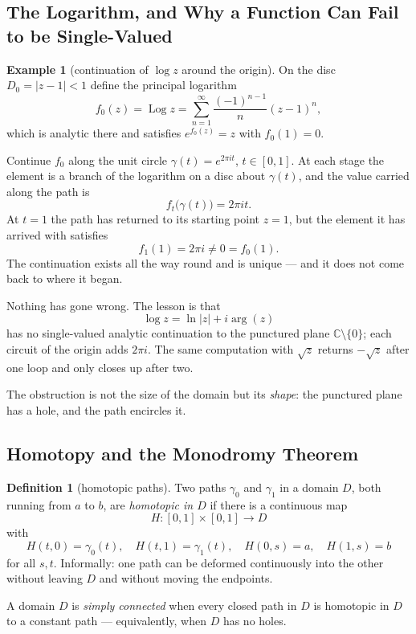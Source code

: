 \documentclass[11pt,a4paper]{article}
\theoremstyle{definition}
\newtheorem{definition}[thm]{Definition}
\newtheorem{example}[thm]{Example}
\begin{document}
{\color[wave]{485}\subsection{The Logarithm, and Why a Function Can Fail to be Single-Valued}}

\begin{example}[continuation of $\log z$ around the origin]
On the disc $D_0 = \left|z - 1\right| < 1$ define the principal logarithm
$$f_0(z) = \operatorname{Log} z = \sum^{\infty}_{n = 1}
\frac{(-1)^{n-1}}{n}(z - 1)^n ,$$
which is analytic there and satisfies $e^{f_0(z)} = z$ with $f_0(1) = 0$.

Continue $f_0$ along the unit circle $\gamma(t) = e^{2\pi i t}$, $t \in [0,1]$.
At each stage the element is a branch of the logarithm on a disc about
$\gamma(t)$, and the value carried along the path is
$$f_t\big(\gamma(t)\big) = 2\pi i t .$$
At $t = 1$ the path has returned to its starting point $z = 1$, but the element
it has arrived with satisfies
$$f_1(1) = 2\pi i \neq 0 = f_0(1).$$
The continuation exists all the way round and is unique --- and it does not come
back to where it began.

Nothing has gone wrong. The lesson is that
$$\log z = \ln\left|z\right| + i\operatorname{arg}(z)$$
has no single-valued analytic continuation to the punctured plane
$\mathbb{C}\setminus\{0\}$; each circuit of the origin adds $2\pi i$. The same
computation with $\sqrt{z}$ returns $-\sqrt{z}$ after one loop and only closes up
after two.

The obstruction is not the size of the domain but its \emph{shape}: the punctured
plane has a hole, and the path encircles it.
\end{example}

{\color[wave]{485}\subsection{Homotopy and the Monodromy Theorem}}

\begin{definition}[homotopic paths]
Two paths $\gamma_0$ and $\gamma_1$ in a domain $D$, both running from $a$ to
$b$, are \emph{homotopic in $D$} if there is a continuous map
$$H : [0,1] \times [0,1] \longrightarrow D$$
with
$$H(t, 0) = \gamma_0(t),\quad  H(t,1) = \gamma_1(t),\quad 
H(0,s) = a,\quad  H(1,s) = b$$
for all $s, t$. Informally: one path can be deformed continuously into the other
without leaving $D$ and without moving the endpoints.

A domain $D$ is \emph{simply connected} when every closed path in $D$ is
homotopic in $D$ to a constant path --- equivalently, when $D$ has no holes.
\end{definition}
\end{document}
